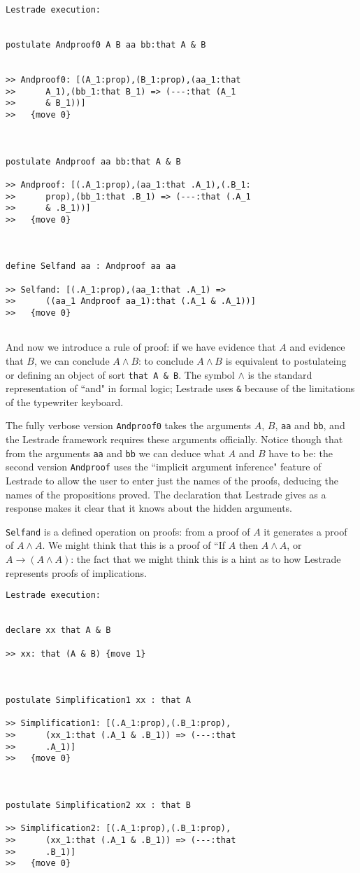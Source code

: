 \documentclass[12pt]{article}
\begin{document}
\begin{verbatim}Lestrade execution:


postulate Andproof0 A B aa bb:that A & B


>> Andproof0: [(A_1:prop),(B_1:prop),(aa_1:that
>>      A_1),(bb_1:that B_1) => (---:that (A_1
>>      & B_1))]
>>   {move 0}



postulate Andproof aa bb:that A & B

>> Andproof: [(.A_1:prop),(aa_1:that .A_1),(.B_1:
>>      prop),(bb_1:that .B_1) => (---:that (.A_1
>>      & .B_1))]
>>   {move 0}



define Selfand aa : Andproof aa aa

>> Selfand: [(.A_1:prop),(aa_1:that .A_1) =>
>>      ((aa_1 Andproof aa_1):that (.A_1 & .A_1))]
>>   {move 0}


\end{verbatim}

And now we introduce a rule of proof:  if we have evidence that $A$ and evidence that $B$, we can conclude $A \wedge B$:  to conclude $A \wedge B$ is equivalent to postulateing or defining an object of sort {\tt that A \& B}.  The symbol $\wedge$ is the standard representation of ``and" in formal logic; Lestrade uses {\tt \&} because of the limitations of the typewriter keyboard.

The fully verbose version {\tt Andproof0} takes the arguments $A$, $B$, {\tt aa} and {\tt bb}, and the Lestrade framework requires these arguments officially.  Notice though that from the arguments {\tt aa} and {\tt bb} we can deduce what $A$ and $B$ have to be:  the second version {\tt Andproof} uses the
``implicit argument inference" feature of Lestrade to allow the user to enter just the names of the proofs, deducing the names of the propositions proved.  The declaration that Lestrade gives as a response makes it clear that it knows about the hidden arguments.

{\tt Selfand} is a defined operation on proofs:  from a proof of $A$ it generates a proof of $A \wedge A$.  We might think that this is a proof of ``If $A$ then $A\wedge A$, or $A  \rightarrow (A\wedge A)$:  the fact that we might think this is a hint as to how Lestrade represents proofs of implications.

\begin{verbatim}Lestrade execution:


declare xx that A & B

>> xx: that (A & B) {move 1}



postulate Simplification1 xx : that A

>> Simplification1: [(.A_1:prop),(.B_1:prop),
>>      (xx_1:that (.A_1 & .B_1)) => (---:that
>>      .A_1)]
>>   {move 0}



postulate Simplification2 xx : that B

>> Simplification2: [(.A_1:prop),(.B_1:prop),
>>      (xx_1:that (.A_1 & .B_1)) => (---:that
>>      .B_1)]
>>   {move 0}


\end{verbatim}
\end{document}
